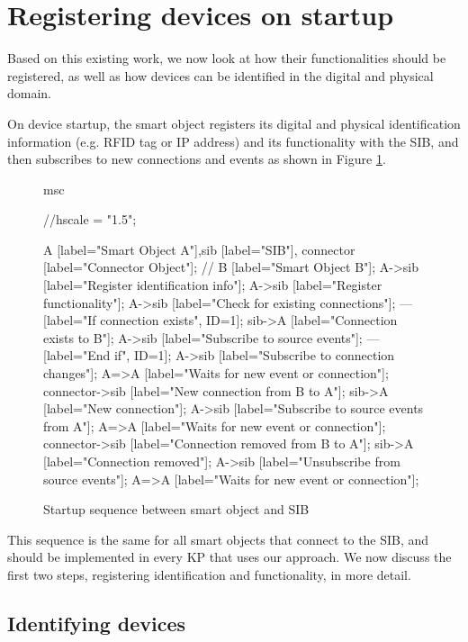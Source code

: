 \section{Registering devices on startup}

Based on this existing work, we now look at how their functionalities should be registered, as well as how devices can be identified in the digital and physical domain.

On device startup, the smart object registers its digital and physical identification information (e.g. RFID tag or IP address) and its functionality with the SIB, and then subscribes to new connections and events as shown in Figure \ref{connectorsibSequence}.

\begin{figure}[bth]
\begin{msc}
msc {
	//hscale = "1.5";
	
    A [label="Smart Object A"],sib [label="SIB"], connector [label="Connector Object"]; // B [label="Smart Object B"];
	A->sib [label="Register identification info"];
	A->sib [label="Register functionality"];
    A->sib [label="Check for existing connections"];
    --- [label="If connection exists", ID=1];
    sib->A [label="Connection exists to B"];
    A->sib [label="Subscribe to source events"];
    --- [label="End if", ID=1];
    A->sib [label="Subscribe to connection changes"];
    A=>A [label="Waits for new event or connection"];
    connector->sib [label="New connection from B to A"];
    sib->A [label="New connection"];
    A->sib [label="Subscribe to source events from A"];
    A=>A [label="Waits for new event or connection"];
    connector->sib [label="Connection removed from B to A"];
    sib->A [label="Connection removed"];
    A->sib [label="Unsubscribe from source events"];
    A=>A [label="Waits for new event or connection"];
}
\end{msc}
        \caption{Startup sequence between smart object and SIB}
        \label{connectorsibSequence}
\end{figure}

This sequence is the same for all smart objects that connect to the \ac{SIB}, and should be implemented in every \ac{KP} that uses our approach. We now discuss the first two steps, registering identification and functionality, in more detail.

\subsection{Identifying devices}

